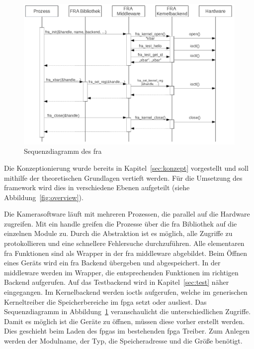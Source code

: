 \begin{figure}[!hbtp]
	\centering
	\includegraphics[width = \linewidth]{pictures/2020-01-10-SequKernel.png}
	\smallskip
	\caption{Sequenzdiagramm des \ac{fra}}
	\label{fig:sequkern}
\end{figure} 

Die Konzeptionierung wurde bereits in Kapitel~\ref{sec:konzept} vorgestellt und soll mithilfe der theoretischen Grundlagen vertieft werden. Für die Umsetzung des \gls{framework} wird dies in verschiedene Ebenen aufgeteilt (siehe Abbildung~\ref{fig:overview}). 


Die Kamerasoftware läuft mit mehreren Prozessen, die parallel auf die Hardware zugreifen. Mit ein \gls{handle} greifen die Prozesse über die \ac{fra} Bibliothek auf die einzelnen Module zu. Durch die Abstraktion ist es möglich, alle Zugriffe zu protokollieren und eine schnellere Fehlersuche durchzuführen. 
Alle elementaren \ac{fra} Funktionen sind als Wrapper in der \ac{fra} \gls{middleware} abgebildet. Beim Öffnen eines Geräts wird ein \ac{fra} Backend übergeben und abgespeichert. In der \gls{middleware} werden im Wrapper, die entsprechenden Funktionen im richtigen Backend aufgerufen. 
Auf das Testbackend wird in Kapitel~\ref{sec:test} näher eingegangen. Im Kernelbackend werden \ac{ioctl}s aufgerufen, welche im generischen Kerneltreiber die Speicherbereiche im \ac{fpga} setzt oder ausliest.
Das Sequenzdiagramm in Abbildung~\ref{fig:sequkern} veranschaulicht die unterschiedlichen Zugriffe.
Damit es möglich ist die Geräte zu öffnen, müssen diese vorher erstellt werden. Dies geschieht beim Laden des \ac{fpga}s im bestehenden \ac{fpga} Treiber. Zum Anlegen werden der Modulname, der Typ, die Speicheradresse und die Größe benötigt. 





